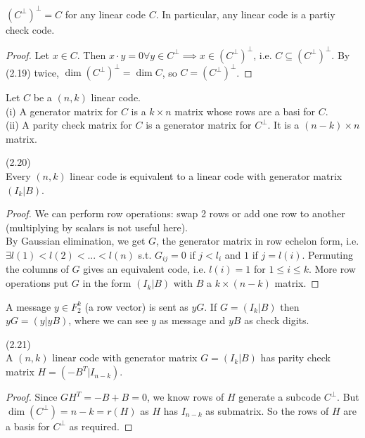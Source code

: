 \documentclass[a4paper]{article}
\begin{document}
\begin{coro}
$(C^\perp)^\perp = C$ for any linear code $C$. In particular, any linear code is a partiy check code.
\begin{proof}
Let $x \in C$. Then $x \cdot y = 0 \forall y \in C^\perp \implies x \in (C^\perp)^\perp$, i.e. $C \subseteq (C^\perp)^\perp$. By (2.19) twice, $\dim(C^\perp)^\perp = \dim C$, so $C = (C^\perp)^\perp$.
\end{proof}
\end{coro}

\begin{defi}
Let $C$ be a $(n,k)$ linear code.\\
(i) A generator matrix for $C$ is a $k \times n$ matrix whose rows are a basi for $C$.\\
(ii) A parity check matrix for $C$ is a generator matrix for $C^\perp$. It is a $(n-k)\times n$ matrix.
\end{defi}

\begin{defi} (2.20)\\
Every $(n,k)$ linear code is equivalent to a linear code with generator matrix $(I_k|B)$.
\begin{proof}
We can perform row operations: swap 2 rows or add one row to another (multiplying by scalars is not useful here).\\
By Gaussian elimination, we get $G$, the generator matrix in row echelon form, i.e. $\exists l(1) < l(2) < ... < l(n)$ s.t. $G_{ij} = 0$ if $j<l_i$ and $1$ if $j=l(i)$. Permuting the columns of $G$ gives an equivalent code, i.e. $l(i) = 1$ for $1 \leq i \leq k$. More row operations put $G$ in the form $(I_k|B)$ with $B$ a $k \times (n-k)$ matrix.
\end{proof}
\end{defi}

\begin{rem}
A message $y\in F_2^k$ (a row vector) is sent as $yG$. If $G = (I_k |B)$ then $yG = (y|yB)$, where we can see $y$ as message and $yB$ as check digits.
\end{rem}

\begin{lemma} (2.21)\\
A $(n,k)$ linear code with generator matrix $G = (I_k|B)$ has parity check matrix $H=(-B^T | I_{n-k})$.
\begin{proof}
Since $GH^T = -B+B =0$, we know rows of $H$ generate a subcode $C^\perp$. But $\dim (C^\perp) = n-k = r(H)$ as $H$ has $I_{n-k}$ as submatrix. So the rows of $H$ are a basis for $C^\perp$ as required.
\end{proof}
\end{lemma}
\end{document}
